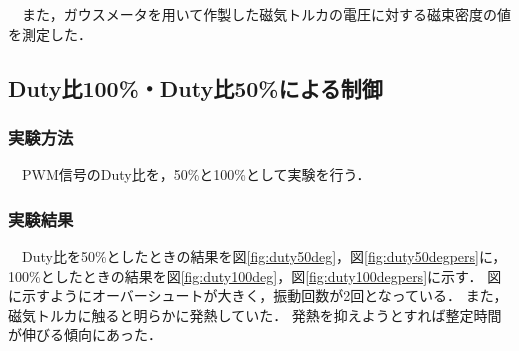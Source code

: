 　また，ガウスメータを用いて作製した磁気トルカの電圧に対する磁束密度の値を測定した．

\subsection{Duty比100\%・Duty比50\%による制御}
\subsubsection{実験方法}
　PWM信号のDuty比を，50\%と100\%として実験を行う．


\subsubsection{実験結果}
　Duty比を50\%としたときの結果を図\ref{fig:duty50deg}，図\ref{fig:duty50degpers}に，100\%としたときの結果を図\ref{fig:duty100deg}，図\ref{fig:duty100degpers}に示す．
図に示すようにオーバーシュートが大きく，振動回数が2回となっている．
また，磁気トルカに触ると明らかに発熱していた．
発熱を抑えようとすれば整定時間が伸びる傾向にあった．

